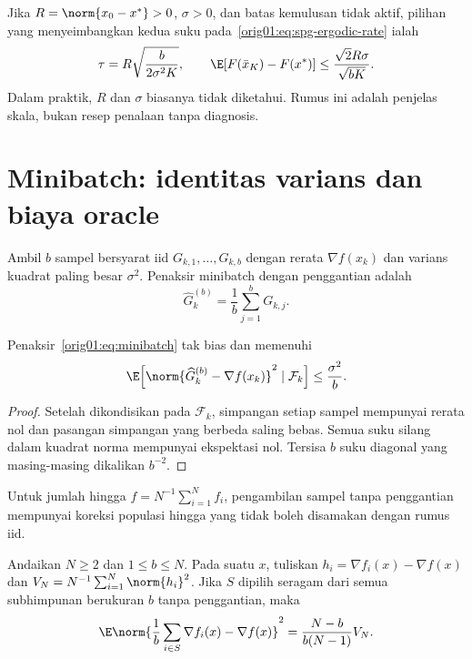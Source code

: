 Jika $R=\norm{x_0-x^*}>0$, $\sigma>0$, dan batas kemulusan tidak aktif,
pilihan yang
menyeimbangkan kedua suku pada~\eqref{orig01:eq:spg-ergodic-rate} ialah
\begin{equation}
  \tau=R\sqrt{\frac{b}{2\sigma^2K}},
  \qquad
  \E[F(\bar x_K)-F(x^*)]
  \leq\frac{\sqrt2R\sigma}{\sqrt{bK}}.
\end{equation}
Dalam praktik, $R$ dan $\sigma$ biasanya tidak diketahui. Rumus ini adalah
penjelas skala, bukan resep penalaan tanpa diagnosis.

\section{Minibatch: identitas varians dan biaya oracle}
\label{orig01:section:minibatch}

Ambil $b$ sampel bersyarat iid $G_{k,1},\dots,G_{k,b}$ dengan rerata
$\nabla f(x_k)$ dan varians kuadrat paling besar $\sigma^2$. Penaksir
minibatch dengan penggantian adalah
\begin{equation}
  \label{orig01:eq:minibatch}
  \widehat G_k^{(b)}=\frac1b\sum_{j=1}^{b}G_{k,j}.
\end{equation}

\begin{prop}
  \label{orig01:prop:minibatch-with-replacement}
  Penaksir~\eqref{orig01:eq:minibatch} tak bias dan memenuhi
  \begin{equation}
    \E\!\left[
      \norm{\widehat G_k^{(b)}-\nabla f(x_k)}^2
      \mid\mathcal F_k
    \right]\leq\frac{\sigma^2}{b}.
  \end{equation}
\end{prop}

\begin{proof}
  Setelah dikondisikan pada $\mathcal F_k$, simpangan setiap sampel mempunyai
  rerata nol dan pasangan simpangan yang berbeda saling bebas. Semua suku
  silang dalam kuadrat norma mempunyai ekspektasi nol. Tersisa $b$ suku
  diagonal yang masing-masing dikalikan $b^{-2}$.
\end{proof}

Untuk jumlah hingga $f=N^{-1}\sum_{i=1}^{N}f_i$, pengambilan sampel tanpa
penggantian mempunyai koreksi populasi hingga yang tidak boleh disamakan
dengan rumus iid.

\begin{prop}
  \label{orig01:prop:finite-population}
  Andaikan $N\geq2$ dan $1\leq b\leq N$. Pada suatu $x$, tuliskan
  $h_i=\nabla f_i(x)-\nabla f(x)$ dan
  $V_N=N^{-1}\sum_{i=1}^{N}\norm{h_i}^2$. Jika $S$ dipilih seragam dari semua
  subhimpunan berukuran $b$ tanpa penggantian, maka
  \begin{equation}
    \label{orig01:eq:finite-population}
    \E\norm{\frac1b\sum_{i\in S}\nabla f_i(x)-\nabla f(x)}^2
    =\frac{N-b}{b(N-1)}V_N.
  \end{equation}
\end{prop}

